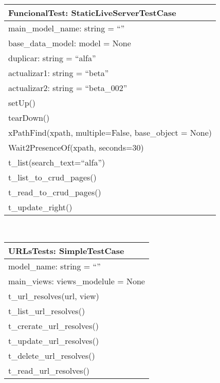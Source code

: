 \begin{tabular}{|l|}
	\hline
	\textbf{FuncionalTest: StaticLiveServerTestCase} \\
	\hline
	main\_model\_name: string = ``'' \\
	base\_data\_model: model = None \\
	duplicar: string = ``alfa'' \\
	actualizar1: string = ``beta'' \\
	actualizar2: string = ``beta\_002'' \\
	\hline
	setUp() \\
	tearDown() \\
	xPathFind(xpath, multiple=False, base\_object = None) \\
	Wait2PresenceOf(xpath, seconds=30) \\
	t\_list(search\_text=``alfa'') \\
	t\_list\_to\_crud\_pages() \\
	t\_read\_to\_crud\_pages() \\
	t\_update\_right() \\
	\hline
\end{tabular} \\

\begin{tabular}{|l|}
	\hline
	\textbf{URLsTests: SimpleTestCase} \\
	\hline 
	model\_name: string = ``'' \\
	main\_views: views\_modelule = None \\
	\hline
	t\_url\_resolves(url, view) \\
	t\_list\_url\_resolves() \\
	t\_crerate\_url\_resolves() \\
	t\_update\_url\_resolves() \\
	t\_delete\_url\_resolves() \\
	t\_read\_url\_resolves() \\
	\hline
\end{tabular} \\

